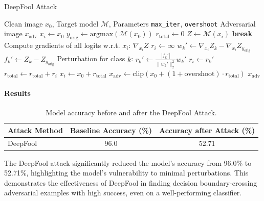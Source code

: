 \documentclass[../main.tex]{subfiles}
\begin{document}
\begin{breakablealgorithm}{DeepFool Attack}
\begin{algorithmic}[1]
\Require Clean image $x_0$, Target model $\mathcal{M}$, Parameters \texttt{max\_iter}, \texttt{overshoot}
\Ensure Adversarial image $x_{\text{adv}}$
\State $x_i \gets x_0$
\State $y_{\text{orig}} \gets \text{argmax}(\mathcal{M}(x_0))$
\State $r_{\text{total}} \gets 0$
    \State $Z \gets \mathcal{M}(x_i)$ 
        \State \textbf{break} 
    \EndIf
    \State Compute gradients of all logits w.r.t. $x_i$: $\nabla_{x_i} Z$
    \State $r_i \gets \infty$
        \State $w_k' \gets \nabla_{x_i} Z_k - \nabla_{x_i} Z_{y_{\text{orig}}}$ 
        \State $f_k' \gets Z_k - Z_{y_{\text{orig}}}$ 
        \State Perturbation for class $k$: $r_k' \gets \frac{|f_k'|}{\|w_k'\|_2^2} w_k'$
            \State $r_i \gets r_k'$ 
        \EndIf
    \EndFor
    \State $r_{\text{total}} \gets r_{\text{total}} + r_i$
    \State $x_i \gets x_0 + r_{\text{total}}$ 
\EndFor
\State $x_{\text{adv}} \gets \text{clip}(x_0 + (1 + \text{overshoot}) \cdot r_{\text{total}})$
\State \Return $x_{\text{adv}}$
\end{algorithmic}
\end{breakablealgorithm}
\paragraph{Results}

\begin{table}[H]
    \centering
    \caption{Model accuracy before and after the DeepFool Attack.}
    \label{tab:deep_fool_accuracy}
    \begin{tabular}{lcc}
        \toprule
        \textbf{Attack Method} & \textbf{Baseline Accuracy (\%)} & \textbf{Accuracy after Attack (\%)} \\
        \midrule
        DeepFool & 96.0 & 52.71 \\
        \bottomrule
    \end{tabular}
\end{table}

\noindent The DeepFool attack significantly reduced the model's accuracy from 96.0\% to 52.71\%, highlighting the model's vulnerability to minimal perturbations. This demonstrates the effectiveness of DeepFool in finding decision boundary-crossing adversarial examples with high success, even on a well-performing classifier.
\end{document}

